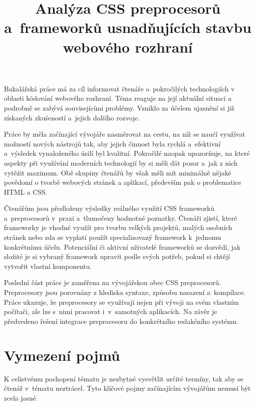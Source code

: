 \documentclass[thesis=B,czech]{FITthesis}[2012/06/26]
\title{Analýza CSS preprocesorů a~frameworků usnadňujících stavbu webového rozhraní}
\begin{document}

\begin{introduction}
	Bakalářská práce má za cíl informovat čtenáře o~pokročilých technologiích v oblasti kódování webového rozhraní. Téma reaguje na její aktuální situaci a podrobně se zabývá souvisejícími problémy. Vzniklo za účelem ujasnění si již získaných zkušeností a~jejich dalšího rozvoje. 

Práce by měla začínající vývojáře nasměrovat na cestu, na níž se naučí využívat možností nových nástrojů tak, aby jejich činnost byla rychlá a~efektivní a~výsledek vynaloženého úsilí byl kvalitní. Pokročilé naopak upozorňuje, na které aspekty při využívání moderních technologií by si měli dát pozor a~jak z nich vytěžit maximum. Obě skupiny čtenářů by však měli mít minimálně nějaké povědomí o tvorbě webových stránek a aplikací, především pak o problematice HTML a CSS.

Čtenářům jsou předloženy výsledky reálného využití CSS frameworků a~preprocesorů v~praxi a~tlumočeny hodnotné poznatky. Čtenáři zjistí, které frameworky je vhodné využít pro tvorbu velkých projektů, malých osobních stránek nebo zda se vyplatí použít specializovaný framework k~jednomu konkrétnímu účelu. Potenciální či aktivní uživatelé frameworků se dozvědí, jak složité je si vybraný framework upravit podle svých potřeb, pokud si chtějí vytvořit vlastní komponentu. 

Poslední část práce je zaměřena na vývojářskou obec CSS preprocesorů. Preprocesory jsou porovnány z hlediska syntaxe, způsobu nasazení a~kompilace. Práce ukazuje, že preprocesory se využívají nejen při vývoji na svém vlastním počítači, ale lze s~nimi pracovat i~v~samotných aplikacích. Na závěr je předvedeno řešení integrace preprocesoru do konkrétního redakčního systému. 

\end{introduction}

\chapter{Vymezení pojmů}
K celistvému pochopení tématu je nezbytné vysvětlit určité termíny, tak aby se čtenář v~tématu neztrácel. Tyto klíčové pojmy začínajícím vývojářům nemusí být zcela jasné. 
\end{document}
